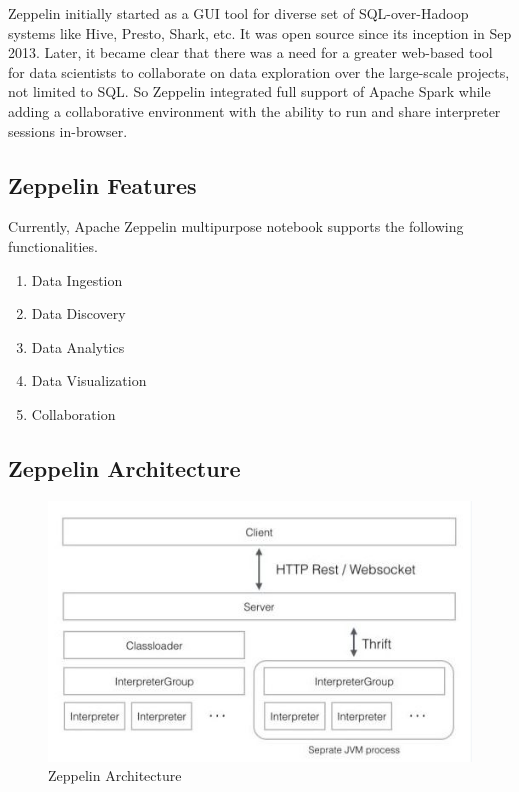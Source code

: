 \documentclass[9pt,twocolumn,twoside]{../../styles/osajnl}
\begin{document}
	Zeppelin initially started as a GUI tool for diverse set of 
	SQL-over-Hadoop systems like Hive, Presto, Shark, etc. It was 
	open 
	source since its inception in Sep 2013. Later, it became clear 
	that 
	there was a need for a greater web-based tool for data scientists 
	to 
	collaborate on data exploration over the large-scale projects, 
	not 
	limited to SQL. So Zeppelin integrated full support of Apache 
	Spark 
	while adding a collaborative environment with the ability to run 
	and 
	share interpreter sessions in-browser.
	
	\subsection{Zeppelin Features}
	
	Currently, Apache Zeppelin multipurpose notebook supports the 
	following functionalities.
	\begin{enumerate}
		\item Data Ingestion
		\item Data Discovery
		\item Data Analytics
		\item Data Visualization
		\item Collaboration
	\end{enumerate}
	
	\subsection{Zeppelin Architecture}
	
	\begin{figure}
		\includegraphics[width=\linewidth]{./images/zeppelin-arch}
		\caption{Zeppelin Architecture}
		\label{fig:Zeppelin Architecture}
	\end{figure}
	
\end{document}
